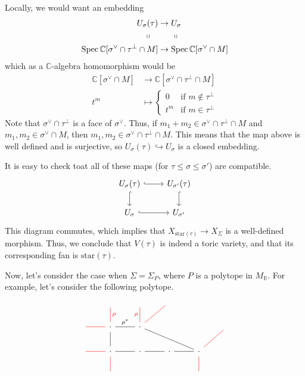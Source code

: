 \documentclass[a4paper,12pt]{amsart}
\newcommand{\RR}{\mathbb{R}}
\newcommand{\CC}{\mathbb{C}}
\DeclareMathOperator{\Spec}{Spec}
\begin{document}
\begin{example}
	Locally, we would want an embedding
	\begin{align*}
	U_\sigma(\tau)&\rightarrow U_\sigma\\
	\shortparallel\ \ \ &\quad\ \ \shortparallel\\
	\Spec\CC[\sigma^\vee\cap\tau^\perp\cap M]&\rightarrow\Spec\CC[\sigma^\vee\cap M]
	\end{align*}
	which as a $\CC$-algebra homomorphism would be
	\begin{align*}
	\CC[\sigma^\vee\cap M]&\rightarrow\CC[\sigma^\vee\cap\tau^\perp\cap M]\\
	t^m&\mapsto\begin{cases}
	0&\text{if }m\not\in\tau^\perp\\
	t^m&\text{if }m\in\tau^\perp
	\end{cases}
	\end{align*}
	Note that $\sigma^\vee\cap\tau^\perp$ is a face of $\sigma^\vee$. Thus, if $m_1+m_2\in\sigma^\vee\cap\tau^\perp\cap M$ and $m_1,m_2\in\sigma^\vee\cap M$, then $m_1,m_2\in\sigma^\vee\cap\tau^\perp\cap M$. This means that the map above is well defined and is surjective, so $U_\sigma(\tau)\hookrightarrow U_\sigma$ is a closed embedding.
\end{example}

It is easy to check toat all of these maps (for $\tau\leq\sigma\leq\sigma'$) are compatible.
$$\begin{tikzcd}
U_\sigma(\tau) \arrow[hookrightarrow]{r} \arrow[hookrightarrow]{d} & U_{\sigma'}(\tau) \arrow[hookrightarrow]{d}\\
U_\sigma \arrow[hookrightarrow]{r} & U_{\sigma'}
\end{tikzcd}$$
This diagram commutes, which implies that $X_{\text{star}(\tau)}\rightarrow X_\Sigma$ is a well-defined morphism. Thus, we conclude that $V(\tau)$ is indeed a toric variety, and that its corresponding fan is $\text{star}(\tau)$.

Now, let's consider the case when $\Sigma=\Sigma_P$, where $P$ is a polytope in $M_\RR$. For example, let's consider the following polytope.

$$ \begin{tikzcd}
\text{}& \text{} \arrow[d,red,dash,"\rho"]&\text{} & \text{} &      \\
\arrow[r,red,dash] &\cdot \arrow[r,dash,"\rho^*"] \arrow[d,dash] & \cdot \arrow[rrd, dash] \arrow[ur,red,dash]  \arrow[u,red,dash,"\rho"] & & &\text{}   \\
\arrow[r,red,dash]&\cdot \arrow[r,dash] \arrow[d,red,dash] &	\cdot &\cdot \arrow[l,dash]   &\cdot  \arrow[l,dash] \arrow[d,red,dash]\arrow[ru,red,dash] &   \\
&\text{} & & &	\text{}
\end{tikzcd}$$
\end{document}
